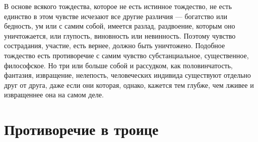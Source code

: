 \documentclass[12pt,oneside]{book}
\begin{document}
В основе всякого тождества, которое не есть истинное тождество, не есть единство в этом чувстве исчезают все другие различия --- богатство или бедность, ум или с самим собой, имеется разлад, раздвоение, которым оно уничтожается, или глупость, виновность или невинность. Поэтому чувство сострадания, участие, есть вернее, должно быть уничтожено. Подобное тождество есть противоречие с самим чувство субстанциальное, существенное, философское. Но три или больше собой и рассудком, как половинчатость, фантазия, извращение, нелепость, человеческих индивида существуют отдельно друг от друга, даже если они которая, однако, кажется тем глубже, чем лживее и извращеннее она на самом деле.






\chapter{Противоречие в троице}
\end{document}
